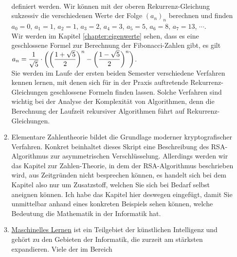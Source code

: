 \begin{enumerate}
\begin{enumerate}
            \\[0.2cm]
            definiert werden.  Wir k\"{o}nnen mit der oberen Rekurrenz-Gleichung sukzessiv die verschiedenen
            Werte der Folge $(a_n)_n$ berechnen und finden 
            \\[0.2cm]
            \hspace*{1.3cm}
            $a_0 = 0$, $a_1 = 1$, $a_2 = 1$, $a_3 = 2$, $a_4 = 3$, $a_5 = 5$, $a_6 = 8$, $a_7 = 13$, $\cdots$.
            \\[0.2cm]
            Wir werden im Kapitel \ref{chapter:eigenwerte} sehen, dass es eine geschlossene Formel zur Berechnung der Fibonacci-Zahlen
            gibt, es gilt
            \\[0.2cm]
            \hspace*{1.3cm}
            $\displaystyle a_n = \frac{1}{\sqrt{5}} \cdot 
            \left( 
                  \biggl(\frac{1 + \sqrt{5}}{2}\biggr)^n - \biggl(\frac{1 - \sqrt{5}}{2}\biggr)^n 
            \right)
            $.
            \\[0.2cm]
            Sie werden im Laufe der ersten beiden Semester verschiedene Verfahren kennen lernen, mit
            denen sich f\"{u}r in der Praxis auftretende Rekurrenz-Gleichungen geschlossene Formeln
            finden lassen.  Solche Verfahren sind wichtig bei der Analyse der Komplexit\"{a}t von
            Algorithmen, denn die Berechnung der Laufzeit rekursiver Algorithmen f\"{u}hrt auf
            Rekurrenz-Gleichungen.   
      \item Elementare Zahlentheorie bildet die Grundlage moderner kryptografischer Verfahren.
            Konkret beinhaltet dieses Skript eine Beschreibung des RSA-Algorithmus zur asymmetrischen
            Verschl\"{u}sselung.  Allerdings werden wir das Kapitel zur Zahlen-Theorie, in dem der 
            RSA-Algorithmus beschrieben wird, aus Zeitgr\"{u}nden nicht besprechen k\"{o}nnen, es handelt
            sich bei dem Kapitel also nur um Zusatzstoff, welchen Sie sich bei Bedarf selbst aneignen
            k\"{o}nnen.  Ich habe das Kapitel hier deswegen eingef\"{u}gt, damit Sie unmittelbar anhand
            eines konkreten Beispiels sehen k\"{o}nnen, welche Bedeutung die Mathematik in der
            Informatik hat.
      \item \href{https://de.wikipedia.org/wiki/Maschinelles_Lernen}{Maschinelles Lernen} ist ein Teilgebiet 
            der k\"{u}nstlichen Intelligenz und geh\"{o}rt 
            zu den Gebieten der Informatik, die zurzeit am st\"{a}rksten expandieren.  Viele der im Bereich

\end{enumerate}
\end{enumerate}
